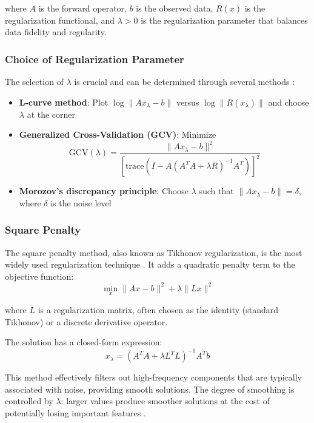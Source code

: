 \documentclass[nomenclature, english, bibtex]{kththesis}
\numberwithin{listing}{chapter}
\begin{document}
where $A$ is the forward operator, $b$ is the observed data, $R(x)$ is the regularization functional, and $\lambda > 0$ is the regularization parameter that balances data fidelity and regularity.

\subsubsection{Choice of Regularization Parameter}
The selection of $\lambda$ is crucial and can be determined through several methods \cite{hansen2010discrete}:

\begin{itemize}
    \item \textbf{L-curve method}: Plot $\log\|Ax_\lambda - b\|$ versus $\log\|R(x_\lambda)\|$ and choose $\lambda$ at the corner
    \item \textbf{Generalized Cross-Validation (GCV)}: Minimize
    \begin{equation}
    \text{GCV}(\lambda) = \frac{\|Ax_\lambda - b\|^2}{[\text{trace}(I - A(A^TA + \lambda R)^{-1}A^T)]^2}
    \end{equation}
    \item \textbf{Morozov's discrepancy principle}: Choose $\lambda$ such that $\|Ax_\lambda - b\| = \delta$, where $\delta$ is the noise level
\end{itemize}

\subsubsection{Square Penalty}

The square penalty method, also known as Tikhonov regularization, is the most widely used regularization technique \cite{tikhonov1977solutions}. It adds a quadratic penalty term to the objective function:
\begin{equation}
\min_x \|Ax - b\|^2 + \lambda \|Lx\|^2
\end{equation}

where $L$ is a regularization matrix, often chosen as the identity (standard Tikhonov) or a discrete derivative operator.

The solution has a closed-form expression:
\begin{equation}
x_\lambda = (A^TA + \lambda L^TL)^{-1}A^Tb
\end{equation}

This method effectively filters out high-frequency components that are typically associated with noise, providing smooth solutions. The degree of smoothing is controlled by $\lambda$: larger values produce smoother solutions at the cost of potentially losing important features \cite{vogel2002computational}.
\end{document}
